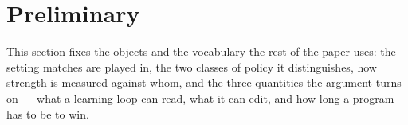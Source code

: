 %

\section{Preliminary}
\label{sec:preliminary}

This section fixes the objects and the vocabulary the rest of the paper uses: the
setting matches are played in, the two classes of policy it distinguishes, how
strength is measured against whom, and the three quantities the argument turns
on --- what a learning loop can read, what it can edit, and how long a program
has to be to win.

%
